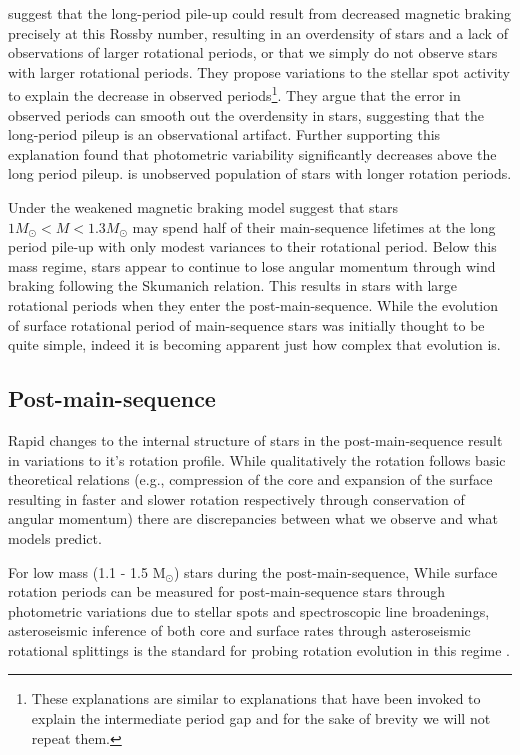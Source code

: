 \citet{van_saders_forward_2019} suggest that the long-period pile-up could result from decreased magnetic braking precisely at this Rossby number, resulting in an overdensity of stars and a lack of observations of larger rotational periods, or that we simply do not observe stars with larger rotational periods.
They propose variations to the stellar spot activity to explain the decrease in observed periods\footnote{These explanations are similar to explanations that have been invoked to explain the intermediate period gap and for the sake of brevity we will not repeat them.}.
They argue that the error in observed periods can smooth out the overdensity in stars, suggesting that the long-period pileup is an observational artifact.
Further supporting this explanation \citet{david_further_2022} found that photometric variability significantly decreases above the long period pileup.
 is unobserved population of stars with longer rotation periods.

Under the weakened magnetic braking model \citet{david_further_2022} suggest that stars $1M_{\odot} < M < 1.3M_{\odot}$  may spend half of their main-sequence lifetimes at the long period pile-up with only modest variances to their rotational period.
Below this mass regime, stars appear to continue to lose angular momentum through wind braking following the Skumanich relation.
This results in stars with large rotational periods when they enter the post-main-sequence.
While the evolution of surface rotational period of main-sequence stars was initially thought to be quite simple, indeed it is becoming apparent just how complex that evolution is.


\subsection{Post-main-sequence}

Rapid changes to the internal structure of stars in the post-main-sequence result in variations to it's rotation profile.
While qualitatively the rotation follows basic theoretical relations (e.g., compression of the core and expansion of the surface resulting in faster and slower rotation respectively through conservation of angular momentum) there are discrepancies between what we observe and what models predict.

For low mass (1.1 - 1.5 M$_{\odot}$) stars during the post-main-sequence, 
While surface rotation periods can be measured for post-main-sequence stars through photometric variations due to stellar spots \citep{mcquillan_rotation_2014, ceillier_surface_2017} and spectroscopic line broadenings, asteroseismic inference of both core and surface rates through asteroseismic rotational splittings is the standard for probing rotation evolution in this regime \citep{deheuvels_seismic_2014, gehan_core_2018, deheuvels_seismic_2020, fellay_asteroseismology_2021}.

